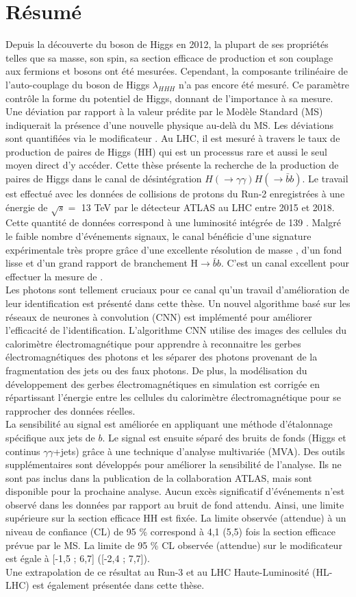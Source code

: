 \newpage
\chapter*{Résumé}

Depuis la découverte du boson de Higgs en 2012, la plupart de ses propriétés telles que sa masse, son spin, sa section efficace de production et son couplage aux fermions et bosons ont été mesurées. Cependant, la composante trilinéaire de l'auto-couplage du boson de Higgs $\lambda_{HHH}$ n'a pas encore été mesuré. Ce paramètre contrôle la forme du potentiel de Higgs, donnant de l'importance à sa mesure. Une déviation par rapport à la valeur prédite par le Modèle Standard (MS) indiquerait la présence d'une nouvelle physique au-delà du MS. Les déviations sont quantifiées via le modificateur \kl. Au LHC, il est mesuré à travers le taux de production de paires de Higgs (HH) qui est un processus rare et aussi le seul moyen direct d'y accéder. Cette thèse présente la recherche de la production de paires de Higgs dans le canal de désintégration $H(\to\gamma\gamma)H(\to\bar{b}b)$. 
Le travail est effectué avec les données de collisions de protons du Run-2 enregistrées à une énergie de $\sqrt{s} = $ 13 TeV par le détecteur ATLAS au LHC entre 2015 et 2018. Cette quantité de données correspond à une luminosité intégrée de 139 \ifb. Malgré le faible nombre d'événements signaux, le canal \bbyy bénéficie d'une signature expérimentale très propre grâce d'une excellente résolution de masse \myy, d'un fond lisse et d'un grand rapport de branchement H$\to\bar{b}b$. C'est un canal excellent pour effectuer la mesure de \kl. \\
Les photons sont tellement cruciaux pour ce canal qu'un travail d'amélioration de leur identification est présenté dans cette thèse. Un nouvel algorithme basé sur les réseaux de neurones à convolution (CNN) est implémenté pour améliorer l'efficacité de l'identification. L'algorithme CNN utilise des images des cellules du calorimètre électromagnétique pour apprendre à reconnaitre les gerbes électromagnétiques des photons et les séparer des photons provenant de la fragmentation des jets ou des faux photons. De plus, la modélisation du développement des gerbes électromagnétiques en simulation est corrigée en répartissant l'énergie entre les cellules du calorimètre électromagnétique pour se rapprocher des données réelles. \\
La sensibilité au signal \HHyybb est améliorée en appliquant une méthode d'étalonnage spécifique aux jets de $b$. Le signal est ensuite séparé des bruits de fonds (Higgs et continus $\gamma\gamma$+jets) grâce à une technique d'analyse multivariée (MVA). Des outils supplémentaires sont développés pour améliorer la sensibilité de l'analyse. Ils ne sont pas inclus dans la publication de la collaboration ATLAS, mais sont disponible pour la prochaine analyse.  Aucun excès significatif d'événements \HHyybb n'est observé dans les données par rapport au bruit de fond attendu. Ainsi, une limite supérieure sur la section efficace HH est fixée. La limite observée (attendue) à un niveau de confiance (CL) de 95 \% correspond à 4,1 (5,5) fois la section efficace prévue par le MS. La limite de 95 \% CL observée (attendue) sur le modificateur \kl est égale à [-1,5 ; 6,7] ([-2,4 ; 7,7]). \\
Une extrapolation de ce résultat au Run-3 et au LHC Haute-Luminosité (HL-LHC) est également présentée dans cette thèse.